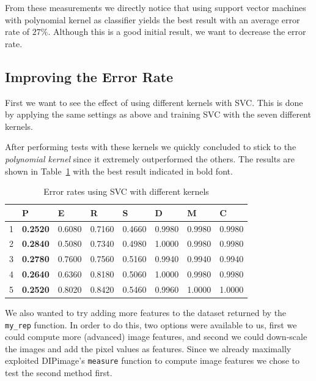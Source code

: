 \documentclass{article}
\begin{document}
From these measurements we directly notice that using support vector machines with polynomial kernel as classifier yields the best result with an average error rate of $27\%$. Although this is a good initial result, we want to decrease the error rate.

\subsection{Improving the Error Rate}

First we want to see the effect of using different kernels with SVC. This is done by applying the same settings as above and training SVC with the seven different kernels.

After performing tests with these kernels we quickly concluded to stick to the \emph{polynomial kernel} since it extremely outperformed the others. The results are shown in Table~\ref{table:results-svc-kernels} with the best result indicated in bold font.

\begin{table}[H]
    \centering
    \begin{tabular}{|l|lllllll|}
    \hline
    & \textbf{P} & \textbf{E} & \textbf{R} & \textbf{S} & \textbf{D} & \textbf{M} & \textbf{C} \\
    \hline
    1 & \textbf{0.2520} &   0.6080 &   0.7160 &   0.4660 &   0.9980 & 0.9980 &   0.9980 \\
    2 & \textbf{0.2840} &   0.5080 &   0.7340 &   0.4980 &   1.0000 & 0.9980 &   0.9980 \\
    3 & \textbf{0.2780} &   0.7600 &   0.7560 &   0.5160 &   0.9940 & 0.9940 &   0.9940 \\
    4 & \textbf{0.2640} &   0.6360 &   0.8180 &   0.5060 &   1.0000 & 0.9980 &   0.9980 \\
    5 & \textbf{0.2520} &   0.8020 &   0.8420 &   0.5460 &   0.9960 & 1.0000 &   1.0000 \\
    \hline
    \end{tabular}
    \caption{Error rates using SVC with different kernels \label{table:results-svc-kernels}}
\end{table}

We also wanted to try adding more features to the dataset returned by the \texttt{my\_rep} function. In order to do this, two options were available to us, first we could compute more (advanced) image features, and second we could down-scale the images and add the pixel values as features. Since we already maximally exploited DIPimage's \texttt{measure} function to compute image features we chose to test the second method first. \\
\end{document}
